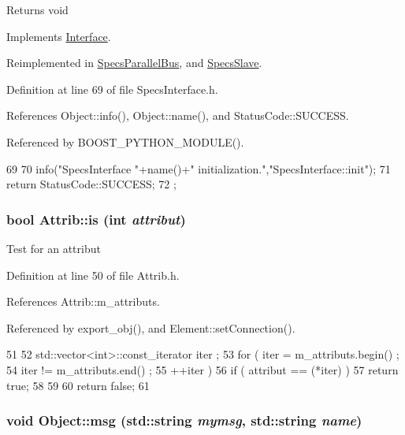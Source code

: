 \begin{DoxyReturn}{Returns}
void 
\end{DoxyReturn}


Implements \hyperlink{classInterface_a1d095c113b1e89d1f5f68323856fee63}{Interface}.

Reimplemented in \hyperlink{classSpecsParallelBus_a43d9435450ba71990004638e42eec1ae}{SpecsParallelBus}, and \hyperlink{classSpecsSlave_ab34b5117373a334027d3a5cf33287bb6}{SpecsSlave}.

Definition at line 69 of file SpecsInterface.h.

References Object::info(), Object::name(), and StatusCode::SUCCESS.

Referenced by BOOST\_\-PYTHON\_\-MODULE().


\begin{DoxyCode}
69                             {
70     info("SpecsInterface "+name()+" initialization.","SpecsInterface::init");
71     return StatusCode::SUCCESS;
72   };
\end{DoxyCode}
\hypertarget{classAttrib_a704f26af560909ad22065083bb7d4c34}{
\subsubsection[{is}]{\setlength{\rightskip}{0pt plus 5cm}bool Attrib::is (int {\em attribut})}}
\label{classAttrib_a704f26af560909ad22065083bb7d4c34}
Test for an attribut 

Definition at line 50 of file Attrib.h.

References Attrib::m\_\-attributs.

Referenced by export\_\-obj(), and Element::setConnection().


\begin{DoxyCode}
51   {
52     std::vector<int>::const_iterator iter ;
53     for ( iter  = m_attributs.begin() ;
54           iter != m_attributs.end()   ;
55           ++iter ) {
56       if ( attribut == (*iter) ) {
57         return true;
58       }
59     }
60     return false;
61   }
\end{DoxyCode}
\hypertarget{classObject_ac5d59299273cee27aacf7de00d2e7034}{
\subsubsection[{msg}]{\setlength{\rightskip}{0pt plus 5cm}void Object::msg (std::string {\em mymsg}, \/  std::string {\em name})}}
\label{classObject_ac5d59299273cee27aacf7de00d2e7034}



